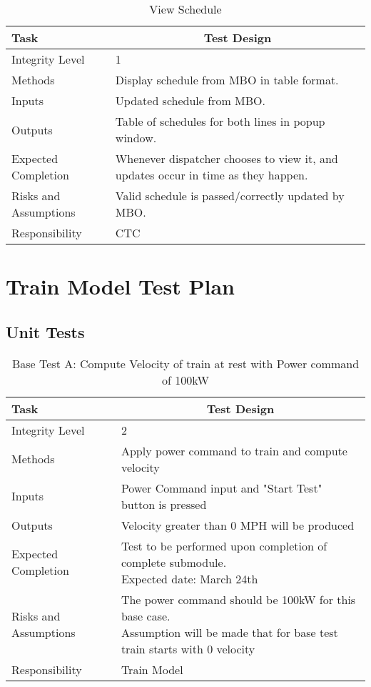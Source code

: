 \documentclass[]{article}
\begin{document}
\begin{table}[H]
	\centering
	\caption{View Schedule}
	\begin{tabular}{|l|l|}
		\hline
		Task & \multicolumn{1}{c|}{Test Design} \\ \hline
		Integrity Level & 1 \\ \hline
		Methods & Display schedule from MBO in table format.\\ \hline
		Inputs &  Updated schedule from MBO. \\ \hline
		Outputs &  Table of schedules for both lines in popup window. \\ \hline
		Expected Completion & \parbox[t]{10cm}{Whenever dispatcher chooses to view it, and updates occur in time as they happen.}\\ \hline
		Risks and Assumptions & \parbox[t]{10cm}{Valid schedule is passed/correctly updated by MBO.} \\ \hline
		Responsibility & CTC\\ \hline
	\end{tabular}
\end{table}

\section{Train Model Test Plan}
\subsection{Unit Tests}
 
    \begin{table}[H]
        \centering
        \caption{Base Test A: Compute Velocity of train at rest with Power command of 100kW}
        \begin{tabular}{|l|l|}
            \hline
            Task & \multicolumn{1}{c|}{Test Design} \\ \hline
            Integrity Level & 2 \\ \hline
            Methods & Apply power command to train and compute velocity  \\ \hline
            Inputs &  Power Command input and "Start Test" button is pressed \\ \hline
            Outputs &  Velocity greater than 0 MPH will be produced  \\ \hline
            Expected Completion & \parbox[t]{10cm}{Test to be performed upon completion of complete submodule.\\ Expected date: March 24th}\\ \hline
            Risks and Assumptions & \parbox[t]{10cm}{The power command should be 100kW for this base case. \\ Assumption will be made that for base test train starts with 0 velocity} \\ \hline
            Responsibility & Train Model\\ \hline
        \end{tabular}
    \end{table}
\end{document}
